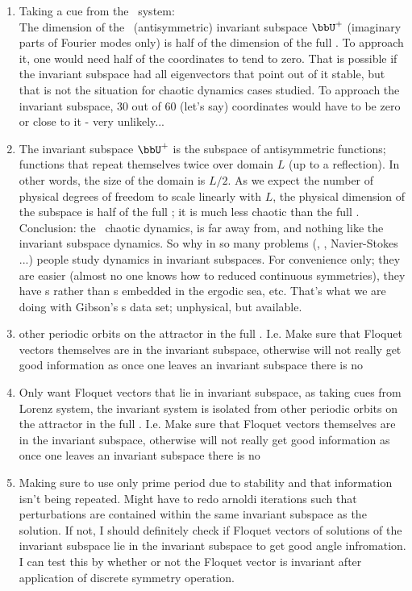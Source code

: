 \begin{description}
{\begin{enumerate}
  \item
Taking a cue from the \KS\ system:
\\
The dimension of the \KS\ (antisymmetric) invariant subspace $\bbU^+$ (imaginary
parts of Fourier modes only) is half of the dimension of the full \statesp.
To approach it, one would need half of the coordinates to tend to zero.
That is possible if the invariant subspace had all eigenvectors that point
out of it stable, but that is not the situation for chaotic dynamics
cases studied. To approach the invariant subspace, 30 out of 60 (let's say)
coordinates would have to be zero or close to it - very unlikely...
  \item
The invariant subspace $\bbU^+$ is the subspace of antisymmetric functions;
functions that repeat themselves twice over domain $L$ (up to a
reflection). In other words, the size of the domain is $L/2$. As we
expect the number of physical degrees of freedom to scale linearly with
$L$, the physical dimension of the subspace is half of the full \statesp;
it is much less chaotic than the full \statesp.
\\
Conclusion: the \KS\ chaotic dynamics, is far away from,
and nothing like the invariant subspace dynamics.
So why in so many problems (\KS, \cGL, Navier-Stokes ...) people study dynamics
in invariant subspaces. For convenience only; they are easier (almost no one
knows how to reduced continuous symmetries), they have {\po}s rather than {\rpo}s
embedded in the ergodic sea, etc. That's what we are doing with Gibson's
{\po}s data set; unphysical, but available.
  \item
other periodic
orbits on the attractor in the full {\statesp}. I.e. Make sure that
Floquet vectors themselves are in the invariant subspace, otherwise
will not really get good information as once one leaves an invariant
subspace there is no
  \item
Only want Floquet vectors that lie in invariant subspace, as taking cues
from Lorenz system, the invariant system is isolated from other periodic
orbits on the attractor in the full {\statesp}. I.e. Make sure that
Floquet vectors themselves are in the invariant subspace, otherwise
will not really get good information as once one leaves an invariant
subspace there is no

  \item
Making sure to use only prime period due to stability and that information isn't being repeated.
Might have to redo arnoldi iterations such that perturbations are contained within the same invariant
subspace as the solution. If not, I should definitely check if Floquet vectors of solutions of
the invariant subspace lie in the invariant subspace to get good angle infromation. I can
test this by whether or not the Floquet vector is invariant after application of discrete symmetry
operation.


\end{enumerate}}
\end{description}
